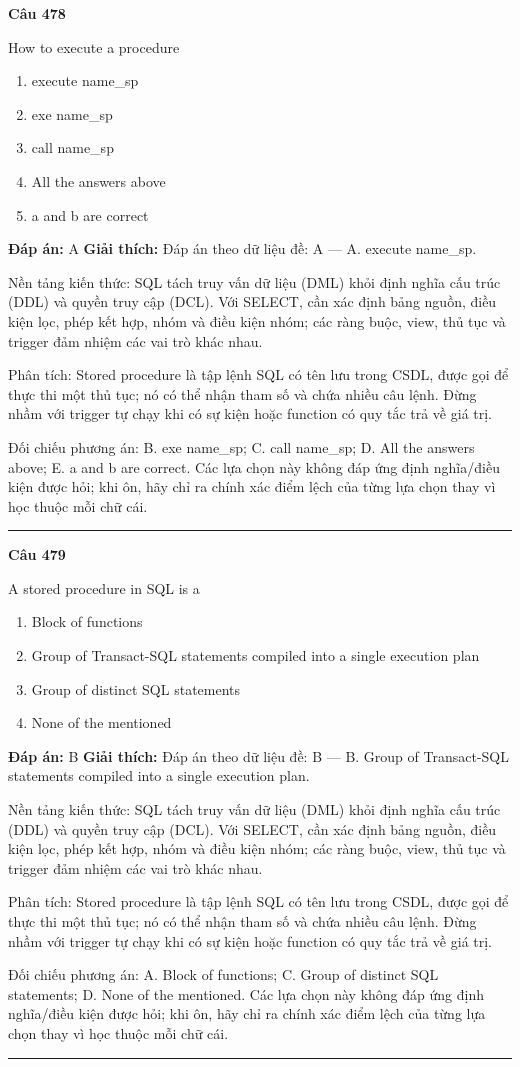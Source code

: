 \documentclass[11pt,a4paper]{article}
\newenvironment{question}[1]{%
  \par\vspace{1em}\noindent\textbf{\large Câu #1}\par\vspace{0.4em}
}{%
  \par\vspace{1em}\hrule\vspace{0.6em}
}
\newenvironment{choices}{%
  \begin{enumerate}[label=\textbf{\Alph*.},leftmargin=2.2em,itemsep=2pt,topsep=3pt]
}{%
  \end{enumerate}
}
\newcommand{\choice}{\item}
\begin{document}
\begin{question}{478}
How to execute a procedure
\begin{choices}
\choice execute name_sp
\choice exe name_sp
\choice call name_sp
\choice All the answers above
\choice a and b are correct
\end{choices}
\textbf{Đáp án:} A
\textbf{Giải thích:} Đáp án theo dữ liệu đề: A — A. execute name_sp.

Nền tảng kiến thức: SQL tách truy vấn dữ liệu (DML) khỏi định nghĩa cấu trúc (DDL) và quyền truy cập (DCL). Với SELECT, cần xác định bảng nguồn, điều kiện lọc, phép kết hợp, nhóm và điều kiện nhóm; các ràng buộc, view, thủ tục và trigger đảm nhiệm các vai trò khác nhau.

Phân tích: Stored procedure là tập lệnh SQL có tên lưu trong CSDL, được gọi để thực thi một thủ tục; nó có thể nhận tham số và chứa nhiều câu lệnh. Đừng nhầm với trigger tự chạy khi có sự kiện hoặc function có quy tắc trả về giá trị.

Đối chiếu phương án: B. exe name_sp; C. call name_sp; D. All the answers above; E. a and b are correct. Các lựa chọn này không đáp ứng định nghĩa/điều kiện được hỏi; khi ôn, hãy chỉ ra chính xác điểm lệch của từng lựa chọn thay vì học thuộc mỗi chữ cái.
\end{question}

\begin{question}{479}
A stored procedure in SQL is a
\begin{choices}
\choice Block of functions
\choice Group of Transact-SQL statements compiled into a single execution plan
\choice Group of distinct SQL statements
\choice None of the mentioned
\end{choices}
\textbf{Đáp án:} B
\textbf{Giải thích:} Đáp án theo dữ liệu đề: B — B. Group of Transact-SQL statements compiled into a single execution plan.

Nền tảng kiến thức: SQL tách truy vấn dữ liệu (DML) khỏi định nghĩa cấu trúc (DDL) và quyền truy cập (DCL). Với SELECT, cần xác định bảng nguồn, điều kiện lọc, phép kết hợp, nhóm và điều kiện nhóm; các ràng buộc, view, thủ tục và trigger đảm nhiệm các vai trò khác nhau.

Phân tích: Stored procedure là tập lệnh SQL có tên lưu trong CSDL, được gọi để thực thi một thủ tục; nó có thể nhận tham số và chứa nhiều câu lệnh. Đừng nhầm với trigger tự chạy khi có sự kiện hoặc function có quy tắc trả về giá trị.

Đối chiếu phương án: A. Block of functions; C. Group of distinct SQL statements; D. None of the mentioned. Các lựa chọn này không đáp ứng định nghĩa/điều kiện được hỏi; khi ôn, hãy chỉ ra chính xác điểm lệch của từng lựa chọn thay vì học thuộc mỗi chữ cái.
\end{question}
\end{document}
